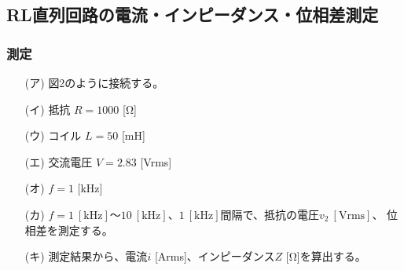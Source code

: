 \documentclass[a4paper]{jarticle}
\begin{document}
		\subsection{RL直列回路の電流・インピーダンス・位相差測定}
			\subsubsection{測定}
				\begin{enumerate}
					\item[(ア)]{図2のように接続する。}
					\item[(イ)]{抵抗 $R = 1000$ [Ω]}
					\item[(ウ)]{コイル $L = 50$ [mH]}
				  \item[(エ)]{交流電圧 $V = 2.83$ [Vrms]}
					\item[(オ)]{$f = 1$ [kHz]}
					\item[(カ)]{$f = 1 \ [\mathrm{kHz}] ～ 10 \ [\mathrm{kHz}]、1 \ [\mathrm{kHz}]$間隔で、抵抗の電圧$v_{2} \ [\mathrm{Vrms}]$、
					位相差を測定する。}
					\item[(キ)]{測定結果から、電流$i$ [Arms]、インピーダンス$Z$ [Ω]を算出する。}
				\end{enumerate}
\end{document}
